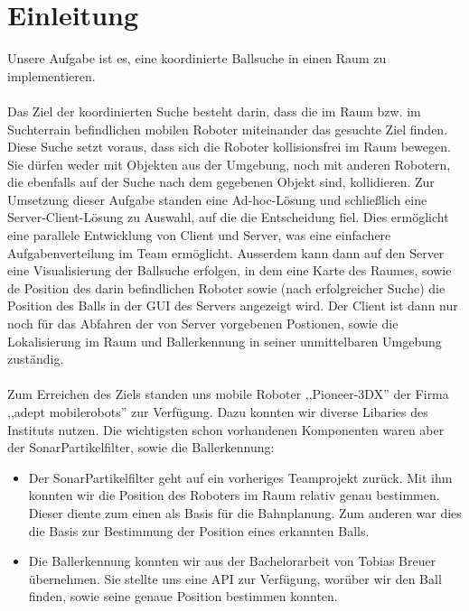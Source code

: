 
    \chapter{Einleitung}
    \label{einleitung}
    Unsere Aufgabe ist es, eine koordinierte Ballsuche in einen Raum
    zu implementieren. \\\\

Das Ziel der koordinierten Suche besteht darin, dass die im Raum bzw. im
Suchterrain befindlichen mobilen Roboter miteinander das gesuchte Ziel
finden. Diese Suche setzt voraus, dass sich die Roboter kollisionsfrei
im Raum bewegen. Sie dürfen weder mit Objekten aus der Umgebung, noch
mit anderen Robotern, die ebenfalls auf der Suche nach dem gegebenen
Objekt sind, kollidieren. Zur Umsetzung dieser Aufgabe standen eine
Ad-hoc-Lösung und schließlich eine Server-Client-Lösung zu Auswahl, auf
die die Entscheidung fiel. Dies ermöglicht eine parallele Entwicklung
von Client und Server, was eine einfachere Aufgabenverteilung im Team
ermöglicht. Ausserdem kann dann auf den Server eine Visualisierung der
Ballsuche erfolgen, in dem eine Karte des Raumes, sowie de Position des darin
befindlichen Roboter sowie (nach erfolgreicher Suche) die Position des Balls in der
GUI des Servers angezeigt wird. Der Client ist dann nur noch für das
Abfahren der von Server vorgebenen Postionen, sowie die Lokalisierung
im Raum und Ballerkennung in seiner unmittelbaren Umgebung
zuständig. \\\\
Zum Erreichen des Ziels standen uns mobile Roboter 
    ,,Pioneer-3DX'' der Firma ,,adept mobilerobots'' zur
    Verfügung. Dazu konnten wir diverse Libaries des Instituts
    nutzen. Die wichtigsten schon vorhandenen Komponenten waren aber
    der SonarPartikelfilter, sowie die Ballerkennung:
    \begin{itemize}
    \item Der SonarPartikelfilter geht auf ein vorheriges Teamprojekt
      zurück. Mit ihm konnten wir die Position des Roboters im Raum
      relativ  genau bestimmen. Dieser diente zum einen als
      Basis für die Bahnplanung. Zum anderen war dies die Basis zur
      Bestimmung der Position eines erkannten Balls.
    \item Die Ballerkennung konnten wir aus der Bachelorarbeit von
      Tobias Breuer übernehmen. Sie stellte uns eine API zur Verfügung,
      worüber wir den Ball finden, sowie seine genaue Position
      bestimmen konnten.
    \end{itemize}

